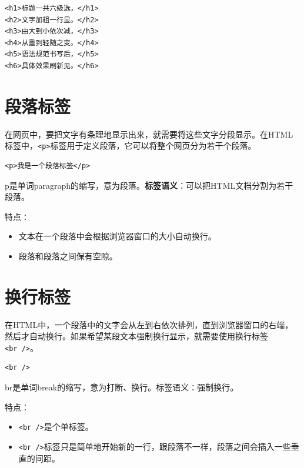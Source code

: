 \documentclass[
]{book}
\providecommand{\tightlist}{%
  \setlength{\itemsep}{0pt}\setlength{\parskip}{0pt}}
\begin{document}
\begin{verbatim}
<h1>标题一共六级选，</h1>
<h2>文字加粗一行显。</h2>
<h3>由大到小依次减，</h3>
<h4>从重到轻随之变。</h4>
<h5>语法规范书写后，</h5>
<h6>具体效果刷新见。</h6>
\end{verbatim}

\hypertarget{ux6bb5ux843dux6807ux7b7e}{%
\section{段落标签}\label{ux6bb5ux843dux6807ux7b7e}}

在网页中，要把文字有条理地显示出来，就需要将这些文字分段显示。在HTML标签中，\texttt{\textless{}p\textgreater{}}标签用于定义段落，它可以将整个网页分为若干个段落。

\begin{verbatim}
<p>我是一个段落标签</p>
\end{verbatim}

p是单词paragraph的缩写，意为段落。\textbf{标签语义}：可以把HTML文档分割为若干段落。

特点∶

\begin{itemize}
\tightlist
\item
  文本在一个段落中会根据浏览器窗口的大小自动换行。
\item
  段落和段落之间保有空隙。
\end{itemize}

\hypertarget{ux6362ux884cux6807ux7b7e}{%
\section{换行标签}\label{ux6362ux884cux6807ux7b7e}}

在HTML中，一个段落中的文字会从左到右依次排列，直到浏览器窗口的右端，然后才自动换行。如果希望某段文本强制换行显示，就需要使用换行标签\texttt{\textless{}br\ /\textgreater{}}。

\begin{verbatim}
<br />
\end{verbatim}

br是单词break的缩写，意为打断、换行。标签语义∶强制换行。

特点︰

\begin{itemize}
\tightlist
\item
  \texttt{\textless{}br\ /\textgreater{}}是个单标签。
\item
  \texttt{\textless{}br\ /\textgreater{}}标签只是简单地开始新的一行，跟段落不一样，段落之间会插入一些垂直的间距。
\end{itemize}
\end{document}
